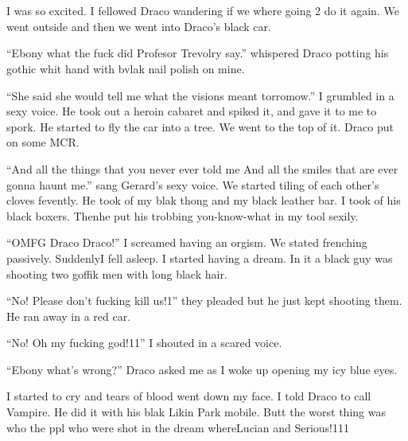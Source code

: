 \section{}



I was so excited. I fellowed Draco wandering if we where going 2 do it again. We went outside and then we went into Draco's black car.

\enquote{Ebony what the fuck did Profesor Trevolry say.} whispered Draco potting his gothic whit hand with bvlak nail polish on mine.

\enquote{She said she would tell me what the visions meant torromow.} I grumbled in a sexy voice. He took out a heroin cabaret and spiked it, and gave it to me to spork. He started to fly the car into a tree. We went to the top of it. Draco put on some MCR.

\enquote{And all the things that you never ever told me
And all the smiles that are ever gonna haunt me.} sang Gerard's sexy voice. We started tiling of each other's cloves fevently. He took of my blak thong and my black leather bar. I took of his black boxers. Then\dotfill\newline he put his trobbing you-know-what in my tool sexily.

\enquote{OMFG Draco Draco!} I screamed having an orgism. We stated frenching passively. Suddenly\dotfill I fell asleep.\newline
I started having a dream. In it a black guy was shooting two goffik men with long black hair.

\enquote{No! Please don't fucking kill us!1} they pleaded but he just kept shooting them. He ran away in a red car.

\enquote{No! Oh my fucking god!11} I shouted in a scared voice.

\enquote{Ebony what's wrong?} Draco asked me as I woke up opening my icy blue eyes.

I started to cry and tears of blood went down my face. I told Draco to call Vampire. He did it with his blak Likin Park mobile. Butt the worst thing was who the ppl who were shot in the dream where\dotfill Lucian and Serious!111

